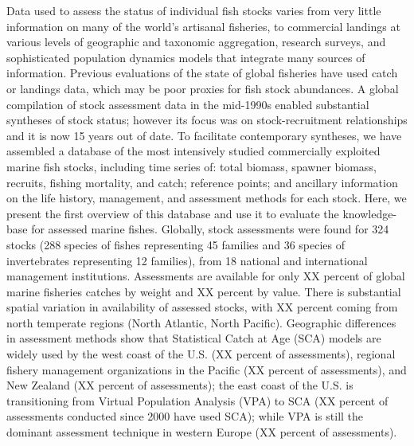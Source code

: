 
Data used to assess the status of individual fish stocks varies from
very little information on many of the world's artisanal fisheries, to
commercial landings at various levels of geographic and taxonomic
aggregation, research surveys, and sophisticated population dynamics
models that integrate many sources of information.  Previous
evaluations of the state of global fisheries have used catch or
landings data, which may be poor proxies for fish stock abundances. A
global compilation of stock assessment data in the mid-1990s enabled
substantial syntheses of stock status; however its focus was on
stock-recruitment relationships and it is now 15 years out of date. To
facilitate contemporary syntheses, we have assembled a database of the
most intensively studied commercially exploited marine fish stocks,
including time series of: total biomass, spawner biomass, recruits,
fishing mortality, and catch; reference points; and ancillary
information on the life history, management, and assessment methods
for each stock.  Here, we present the first overview of this database
and use it to evaluate the knowledge-base for assessed marine fishes.
Globally, stock assessments were found for 324
stocks (288 species of fishes representing
45 families and 36
species of invertebrates representing 12
families), from 18 national and international
management institutions. Assessments are available for only XX percent
of global marine fisheries catches by weight and XX percent by value.
There is substantial spatial variation in availability of assessed
stocks, with XX percent coming from north temperate regions (North
Atlantic, North Pacific).  Geographic differences in assessment
methods show that Statistical Catch at Age (SCA) models are widely
used by the west coast of the U.S. (XX percent of assessments),
regional fishery management organizations in the Pacific (XX percent
of assessments), and New Zealand (XX percent of assessments); the east
coast of the U.S. is transitioning from Virtual Population Analysis
(VPA) to SCA (XX percent of assessments conducted since 2000 have used
SCA); while VPA is still the dominant assessment
technique in western Europe (XX percent of assessments).\\

